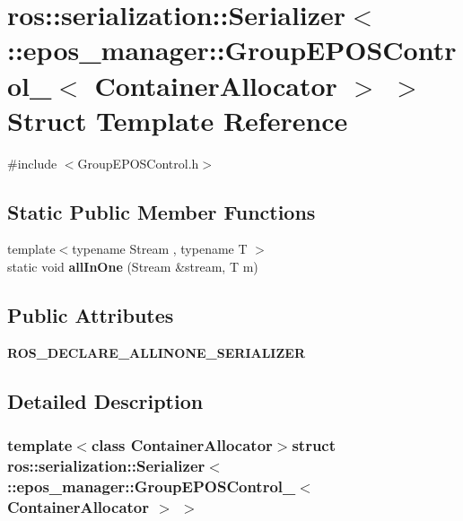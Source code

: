 \section{ros\-:\-:serialization\-:\-:\-Serializer$<$ \-:\-:epos\-\_\-manager\-:\-:\-Group\-E\-P\-O\-S\-Control\-\_\-$<$ \-Container\-Allocator $>$ $>$ \-Struct \-Template \-Reference}
\label{structros_1_1serialization_1_1Serializer_3_01_1_1epos__manager_1_1GroupEPOSControl___3_01ContainerAllocator_01_4_01_4}


{\ttfamily \#include $<$\-Group\-E\-P\-O\-S\-Control.\-h$>$}

\subsection*{\-Static \-Public \-Member \-Functions}
\begin{DoxyCompactItemize}
\item 
{\footnotesize template$<$typename Stream , typename T $>$ }\\static void {\bf all\-In\-One} (\-Stream \&stream, \-T m)
\end{DoxyCompactItemize}
\subsection*{\-Public \-Attributes}
\begin{DoxyCompactItemize}
\item 
{\bf \-R\-O\-S\-\_\-\-D\-E\-C\-L\-A\-R\-E\-\_\-\-A\-L\-L\-I\-N\-O\-N\-E\-\_\-\-S\-E\-R\-I\-A\-L\-I\-Z\-E\-R}
\end{DoxyCompactItemize}


\subsection{\-Detailed \-Description}
\subsubsection*{template$<$class Container\-Allocator$>$struct ros\-::serialization\-::\-Serializer$<$ \-::epos\-\_\-manager\-::\-Group\-E\-P\-O\-S\-Control\-\_\-$<$ Container\-Allocator $>$ $>$}



